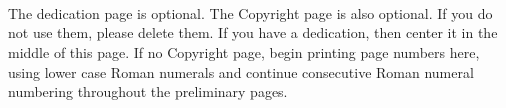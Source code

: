 
\chapter*{}
\hspace{1em} \vspace{17em} \\ %
\begin{center}
The dedication page is optional. The Copyright page is also optional. If you do not use them, please delete them. If you have a dedication, then center it in the middle of this page. If no Copyright page, begin printing page numbers here, using lower case Roman numerals and continue consecutive Roman numeral numbering throughout the preliminary pages.
\end{center}
 